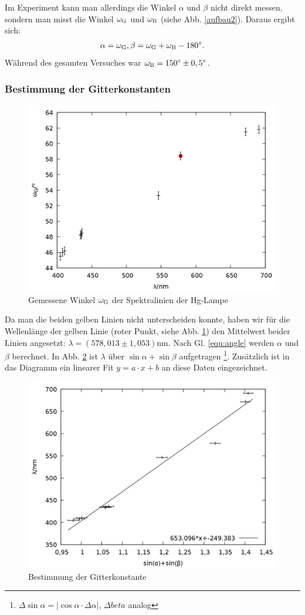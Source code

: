 Im Experiment kann man allerdings die Winkel $\alpha$ und $\beta$ nicht direkt messen, sondern man misst die Winkel $\omega_\mathrm{G}$ und $\omega_\mathrm{B}$ (siehe Abb. \ref{aufbau2}). Daraus ergibt sich:
\begin{align}
\alpha = \omega_\mathrm{G}, \beta = \omega_\mathrm{G}+\omega_\mathrm{B}-180^\circ.
\label{equ:angle}
\end{align}
Während des gesamten Versuches war $\omega_\mathrm{B}=150^\circ \pm 0,5^\circ$.

\subsubsection{Bestimmung der Gitterkonstanten}
\begin{figure}[h]
  \centering
  \includegraphics[width=0.75\linewidth]{data/Balmer/out_hg_raw.png}
  \caption{Gemessene Winkel $\omega_\mathrm{G}$ der Spektralinien der Hg-Lampe}
  \label{fig:hg_raw}
\end{figure}

Da man die beiden gelben Linien nicht unterscheiden konnte, haben wir für die Wellenlänge der gelben Linie (roter Punkt, siehe Abb. \ref{fig:hg_raw}) den Mittelwert beider Linien angesetzt: $\lambda = \si{(578,013 \pm 1,053) \nano \metre}$. Nach Gl. \ref{equ:angle} werden $\alpha$ und $\beta$ berechnet. In Abb. \ref{fig:hg} ist $\lambda$ über $\sin{\alpha} + \sin{\beta}$ aufgetragen \footnote{$\Delta \sin{\alpha} = |\cos{\alpha} \cdot \Delta \alpha|$, $\Delta beta$ analog}. Zusätzlich ist in das Diagramm ein linearer Fit $y = a\cdot x + b$ an diese Daten eingezeichnet.
\begin{figure}[h]
  \centering
  \includegraphics[width=0.75\linewidth]{data/Balmer/out_hg.png}
  \caption{Bestimmung der Gitterkonstante}
  \label{fig:hg}
\end{figure}

